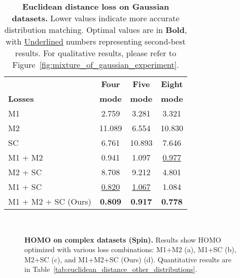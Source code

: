 \begin{table}[!ht] 
\centering
\caption{
\textbf{Euclidean distance loss on Gaussian datasets.} Lower values indicate more accurate distribution matching. Optimal values are in \textbf{Bold}, with \underline{Underlined} numbers representing second-best results.
For qualitative results, please refer to Figure~\ref{fig:mixture_of_gaussian_experiment}.
}
\label{tab:euclidean_distance}
\begin{tabular}{l|c|c|c}
\toprule
& \textbf{Four} & \textbf{Five} & \textbf{Eight} \\
\textbf{Losses}  & \textbf{mode} & \textbf{mode} & \textbf{mode} \\
\midrule
M1              & 2.759 & 3.281 & 3.321 \\
M2              & 11.089 & 6.554 & 10.830 \\
SC              & 6.761 & 10.893 & 7.646 \\
M1 + M2          & 0.941 & 1.097 & \underline{0.977} \\
M2 + SC          & 8.708 & 9.212 & 4.801 \\
M1 + SC  \cite{fhla24}        & \underline{0.820} & \underline{1.067} & 1.084 \\
M1 + M2 + SC   (Ours)   & \textbf{0.809} & \textbf{0.917} & \textbf{0.778} \\
\bottomrule
\end{tabular}
\end{table}



\begin{figure*}[!ht]  
\centering
{}
\\
\caption{
\textbf{HOMO on complex datasets (Spin).} Results show HOMO optimized with various loss combinations: M1+M2 (a), M1+SC \cite{fhla24} (b), M2+SC (c), and M1+M2+SC (Ours) (d). Quantitative results are in Table~\ref{tab:euclidean_distance_other_distributions}.
}
\label{fig:circle_irr_circle_spiral}
\end{figure*}



